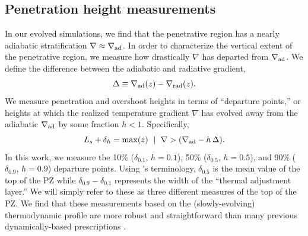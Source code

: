 \documentclass[twocolumn]{aastex631}
\newcommand{\gradrad}{\ensuremath{\nabla_{\rm{rad}}}}
\newcommand{\gradad}{\ensuremath{\nabla_{\rm{ad}}}}
\newcommand{\justgrad}{\ensuremath{\nabla}}
\begin{document}
\subsection{Penetration height measurements}
In our evolved simulations, we find that the penetrative region has a nearly adiabatic stratification $\justgrad \approx \gradad$.
In order to characterize the vertical extent of the penetrative region, we measure how drastically $\justgrad$ has departed from $\gradad$.
We define the difference between the adiabatic and radiative gradient,
\begin{equation}
\Delta \equiv \gradad(z) - \gradrad(z).
\end{equation}
We measure penetration and overshoot heights in terms of ``departure points,'' or heights at which the realized temperature gradient $\justgrad$ has evolved away from the adiabatic $\gradad$ by some fraction $h < 1$.
Specifically,
\begin{equation}
L_s + \delta_{h} = \mathrm{max}(z) \,\,\mid\,\, \justgrad > (\gradad - h\,\Delta).
\label{eqn:delta_p_measures}
\end{equation}
In this work, we measure the 10\% ($\delta_{0.1}$, $h=0.1$), 50\% ($\delta_{0.5}$, $h=0.5$), and 90\% ($\delta_{0.9}$, $h=0.9$) departure points.
Using \citet{zahn1991}'s terminology, $\delta_{0.5}$ is the mean value of the top of the PZ while $\delta_{0.9} - \delta_{0.1}$ represents the width of the ``thermal adjustment layer.''
We will simply refer to these as three different measures of the top of the PZ.
We find that these measurements based on the (slowly-evolving) thermodynamic profile are more robust and straightforward than many previous dynamically-based prescriptions \citep[see e.g.,][for a nice discussion]{pratt_etal_2017}.
\end{document}

